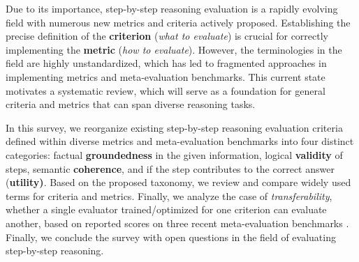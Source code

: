 
Due to its importance, step-by-step reasoning evaluation is a rapidly evolving field with numerous new metrics and criteria actively proposed. Establishing the precise definition of the \textbf{criterion} (\textit{what to evaluate}) is crucial for correctly implementing the \textbf{metric} (\textit{how to evaluate}). However, the terminologies in the field are highly unstandardized, which has led to fragmented approaches in implementing metrics and meta-evaluation benchmarks. This current state motivates a systematic review, which will serve as a foundation for general criteria and metrics that can span diverse reasoning tasks.

In this survey, we reorganize existing step-by-step reasoning evaluation criteria defined within diverse metrics and meta-evaluation benchmarks into four distinct categories: factual \textbf{groundedness} in the given information, logical \textbf{validity} of steps, semantic \textbf{coherence}, and if the step contributes to the correct answer (\textbf{utility)}. Based on the proposed taxonomy, we review and compare widely used terms for criteria and metrics. Finally, we analyze the case of \textit{transferability}, whether a single evaluator trained/optimized for one criterion can evaluate another, based on reported scores on three recent meta-evaluation benchmarks \citep{jacovi-etal-2024-chain, song2025prmbenchfinegrainedchallengingbenchmark, zheng2024processbenchidentifyingprocesserrors}.
Finally, we conclude the survey with open questions in the field of evaluating step-by-step reasoning.

